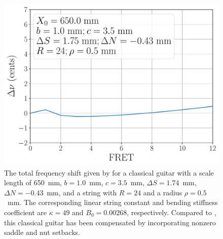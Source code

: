 \begin{figure}
  \centering
  \includegraphics[width=5.0in]{../figures/comp_est}
  \caption{\label{fig:comp_est} The total frequency shift given by  for a classical guitar with a scale length of 650~mm, $b = 1.0$~mm, $c = 3.5$~mm, $\Delta S = 1.74$~mm, $\Delta N = -0.43$~mm, and a string with $R = 24$ and a radius $\rho = 0.5$~mm. The corresponding linear string constant and bending stiffness coefficient are $\kappa = 49$ and $B_0 = 0.00268$, respectively. Compared to , this classical guitar has been compensated by incorporating nonzero saddle and nut setbacks.}
\end{figure}
